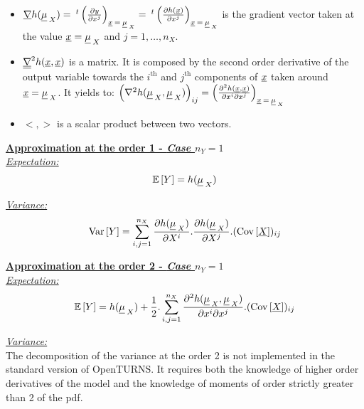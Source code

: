 {\begin{itemize}
  \item $\underline{\nabla} h(\underline{\mu}_{\:X}) = \: ^t \left( \frac{\partial y}{\partial x^j}\right)_{\underline{x}\: =\: \underline{\mu}_{\:X}} = \: ^t \left( \frac{\partial h(\underline{x})}{\partial x^j}\right)_{\underline{x}\: =\: \underline{\mu}_{\:X}} $ is the gradient vector taken at the value $\underline{x} = \underline{\mu}_{\:X}$ and $j=1,\ldots,n_X$.

  \item $\underline{\underline{\nabla}}^2 h(\underline{x},\underline{x})$ is a matrix. It is composed by the second order derivative of the output variable towards the $i^\textrm{th}$ and $j^\textrm{th}$ components of $\underline{x}$ taken around $\underline{x} = \underline{\mu}_{\:X}$. It yields to: $\left( \nabla^2 h(\underline{\mu}_{\:X},\underline{\mu}_{\:X}) \right)_{ij} =\left( \frac{\partial^2 h(\underline{x},\underline{x})}{\partial x^i \partial x^j}\right)_{\underline{x}\: =\: \underline{\mu}_{\:X}}$
  \item $<,>$ is a scalar product between two vectors.

  \end{itemize}

  \underline{\textbf{Approximation at the order 1 - \textit{Case $n_Y = 1$}}}\\

  \underline{\textit{Expectation:}}\\

  \begin{align*}
    {\mathbb E}\left[ Y \right] = h(\underline{\mu}_{\:X})
  \end{align*}

  \underline{\textit{Variance:}}\\

  \begin{align*}
    {\rm Var}\left[ Y \right] = \sum_{i,j=1}^{n_X} \frac{\partial h(\underline{\mu}_{\:X})}{\partial X^i} . \frac{\partial h(\underline{\mu}_{\:X})}{\partial X^j}.({\rm Cov}\left[ \underline{X} \right])_{ij}
  \end{align*}

  \underline{\textbf{Approximation at the order 2 - \textit{Case $n_Y = 1$}}}\\

  \underline{\textit{Expectation:}}\\
  \begin{eqnarray*}
    \begin{split}
      {\mathbb E}\left[ Y \right] = h(\underline{\mu}_{\:X}) + \frac{1}{2}. \sum_{i,j=1}^{n_X} \frac{\partial^2 h(\underline{\mu}_{\:X},\underline{\mu}_{\:X})}{\partial x^i \partial x^j} . ({\rm Cov}\left[ \underline{X} \right])_{ij}
    \end{split}
  \end{eqnarray*}

  \underline{\textit{Variance:}}\\
  The decomposition of the variance at the order 2 is not implemented in the standard version of OpenTURNS. It requires both the knowledge of higher order derivatives of the model and the knowledge of moments of order strictly greater than 2 of the pdf.\\


}
